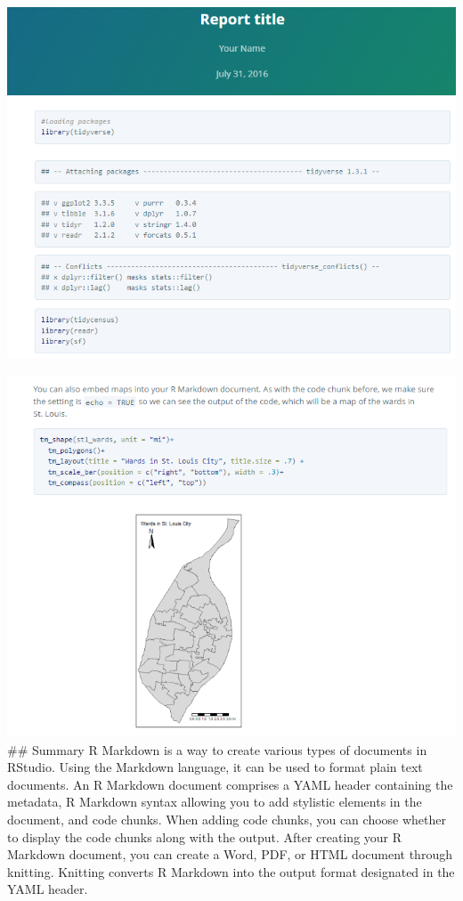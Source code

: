 \documentclass[
  krantz2]{krantz}
\begin{document}
\includegraphics{images/pretty_doc_1.png}

\includegraphics{images/pretty_doc_2.png}
\#\# Summary
R Markdown is a way to create various types of documents in RStudio. Using the Markdown language, it can be used to format plain text documents. An R Markdown document comprises a YAML header containing the metadata, R Markdown syntax allowing you to add stylistic elements in the document, and code chunks. When adding code chunks, you can choose whether to display the code chunks along with the output. After creating your R Markdown document, you can create a Word, PDF, or HTML document through knitting. Knitting converts R Markdown into the output format designated in the YAML header.
\end{document}
